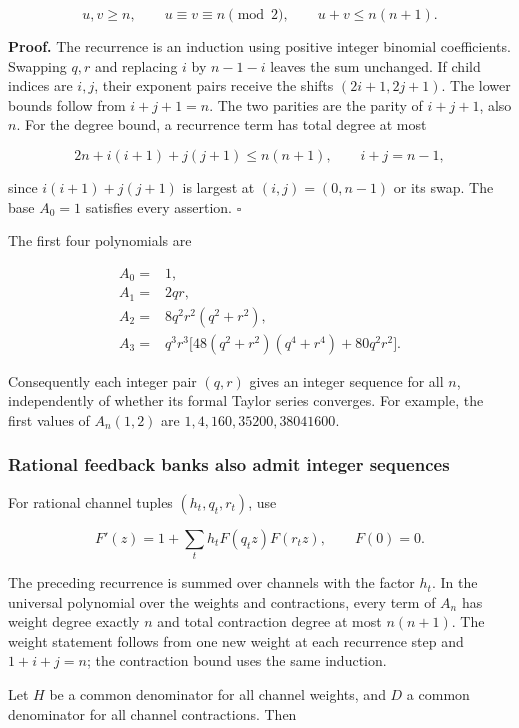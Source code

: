 \[
u,v\ge n,\qquad u\equiv v\equiv n\pmod2,\qquad u+v\le n(n+1).
\]

\textbf{Proof.} The recurrence is an induction using positive integer
binomial coefficients. Swapping \(q,r\) and replacing \(i\) by \(n-1-i\)
leaves the sum unchanged. If child indices are \(i,j\), their exponent
pairs receive the shifts \((2i+1,2j+1)\). The lower bounds follow from
\(i+j+1=n\). The two parities are the parity of \(i+j+1\), also \(n\).
For the degree bound, a recurrence term has total degree at most

\[
2n+i(i+1)+j(j+1)\le n(n+1),\qquad i+j=n-1,
\]

since \(i(i+1)+j(j+1)\) is largest at \((i,j)=(0,n-1)\) or its swap. The
base \(A_0=1\) satisfies every assertion. \(\square\)

The first four polynomials are

\[
\begin{aligned}
A_0={}&1,\\
A_1={}&2qr,\\
A_2={}&8q^2r^2(q^2+r^2),\\
A_3={}&q^3r^3\bigl[48(q^2+r^2)(q^4+r^4)+80q^2r^2\bigr].
\end{aligned}
\]

Consequently each integer pair \((q,r)\) gives an integer sequence for
all \(n\), independently of whether its formal Taylor series converges.
For example, the first values of \(A_n(1,2)\) are
\(1,4,160,35200,38041600\).

\hypertarget{rational-feedback-banks-also-admit-integer-sequences}{%
\subsubsection{Rational feedback banks also admit integer
sequences}\label{rational-feedback-banks-also-admit-integer-sequences}}

For rational channel tuples \((h_t,q_t,r_t)\), use

\[
F'(z)=1+\sum_t h_tF(q_tz)F(r_tz),\qquad F(0)=0.
\]

The preceding recurrence is summed over channels with the factor
\(h_t\). In the universal polynomial over the weights and contractions,
every term of \(A_n\) has weight degree exactly \(n\) and total
contraction degree at most \(n(n+1)\). The weight statement follows from
one new weight at each recurrence step and \(1+i+j=n\); the contraction
bound uses the same induction.

Let \(H\) be a common denominator for all channel weights, and \(D\) a
common denominator for all channel contractions. Then

